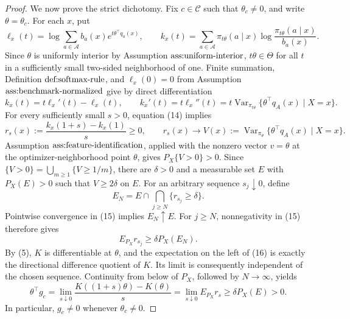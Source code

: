 \documentclass{article}
\begin{document}
\begin{proof}
We now prove the strict dichotomy.  Fix \(c\in\mathcal C\) such that \(\theta_c\neq0\), and write \(\theta=\theta_c\).  For each \(x\), put
\[
 \ell_x(t)=\log\sum_{a\in\mathcal A}b_a(x)e^{t\theta^\top q_a(x)},
 \qquad
 k_x(t)=\sum_{a\in\mathcal A}\pi_{t\theta}(a\mid x)
             \log\frac{\pi_{t\theta}(a\mid x)}{b_a(x)}.
\]
Since \(\theta\) is uniformly interior by Assumption \(\textnormal{ass:uniform-interior}\), \(t\theta\in\Theta\) for all \(t\) in a sufficiently small two-sided neighborhood of one.  Finite summation, Definition \(\textnormal{def:softmax-rule}\), and \(\ell_x(0)=0\) from Assumption \(\textnormal{ass:benchmark-normalized}\) give by direct differentiation
\[
 k_x(t)=t\ell_x'(t)-\ell_x(t),
 \qquad
 k_x'(t)=t\ell_x''(t)
 =t\operatorname{Var}_{\pi_{t\theta}}
       \{\theta^\top q_A(x)\mid X=x\}.                         \tag{14}
\]
For every sufficiently small \(s>0\), equation (14) implies
\[
 r_s(x):=\frac{k_x(1+s)-k_x(1)}{s}\geq0,
 \qquad
 r_s(x)\longrightarrow
 V(x):=\operatorname{Var}_{\pi_\theta}
       \{\theta^\top q_A(x)\mid X=x\}.                        \tag{15}
\]
Assumption \(\textnormal{ass:feature-identification}\), applied with the nonzero vector \(v=\theta\) at the optimizer-neighborhood point \(\theta\), gives \(P_X\{V>0\}>0\).  Since \(\{V>0\}=\bigcup_{m\geq1}\{V\geq1/m\}\), there are \(\delta>0\) and a measurable set \(E\) with \(P_X(E)>0\) such that \(V\geq2\delta\) on \(E\).  For an arbitrary sequence \(s_j\downarrow0\), define
\[
 E_N=E\cap\bigcap_{j\geq N}\{r_{s_j}\geq\delta\}.
\]
Pointwise convergence in (15) implies \(E_N\uparrow E\).  For \(j\geq N\), nonnegativity in (15) therefore gives
\[
 E_{P_X}r_{s_j}\geq\delta P_X(E_N).                            \tag{16}
\]
By (5), \(K\) is differentiable at \(\theta\), and the expectation on the left of (16) is exactly the directional difference quotient of \(K\).  Its limit is consequently independent of the chosen sequence.  Continuity from below of \(P_X\), followed by \(N\to\infty\), yields
\[
 \theta^\top g_c
 =\lim_{s\downarrow0}\frac{K((1+s)\theta)-K(\theta)}{s}
 =\lim_{s\downarrow0}E_{P_X}r_s
 \geq\delta P_X(E)>0.                                         \tag{17}
\]
In particular, \(g_c\neq0\) whenever \(\theta_c\neq0\).


\end{proof}
\end{document}
